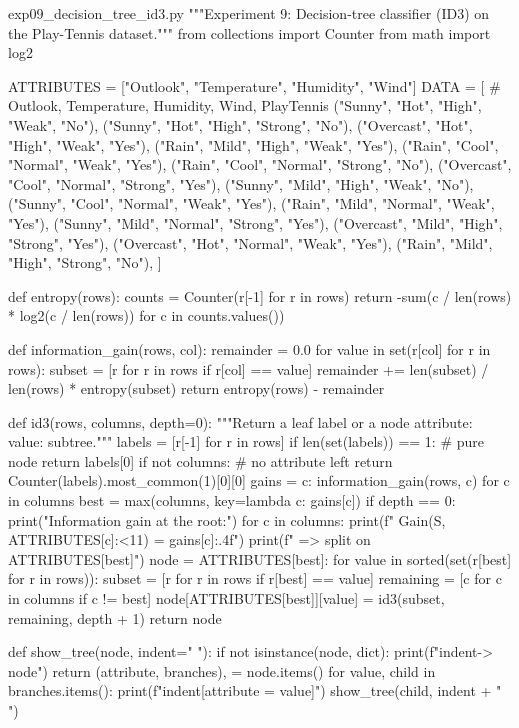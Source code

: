 \documentclass[11pt,a4paper]{article}
\begin{document}
\begin{pycode}{exp09\_decision\_tree\_id3.py}
"""Experiment 9: Decision-tree classifier (ID3) on the Play-Tennis dataset."""
from collections import Counter
from math import log2

ATTRIBUTES = ["Outlook", "Temperature", "Humidity", "Wind"]
DATA = [  # Outlook, Temperature, Humidity, Wind, PlayTennis
    ("Sunny", "Hot", "High", "Weak", "No"),
    ("Sunny", "Hot", "High", "Strong", "No"),
    ("Overcast", "Hot", "High", "Weak", "Yes"),
    ("Rain", "Mild", "High", "Weak", "Yes"),
    ("Rain", "Cool", "Normal", "Weak", "Yes"),
    ("Rain", "Cool", "Normal", "Strong", "No"),
    ("Overcast", "Cool", "Normal", "Strong", "Yes"),
    ("Sunny", "Mild", "High", "Weak", "No"),
    ("Sunny", "Cool", "Normal", "Weak", "Yes"),
    ("Rain", "Mild", "Normal", "Weak", "Yes"),
    ("Sunny", "Mild", "Normal", "Strong", "Yes"),
    ("Overcast", "Mild", "High", "Strong", "Yes"),
    ("Overcast", "Hot", "Normal", "Weak", "Yes"),
    ("Rain", "Mild", "High", "Strong", "No"),
]


def entropy(rows):
    counts = Counter(r[-1] for r in rows)
    return -sum(c / len(rows) * log2(c / len(rows)) for c in counts.values())


def information_gain(rows, col):
    remainder = 0.0
    for value in set(r[col] for r in rows):
        subset = [r for r in rows if r[col] == value]
        remainder += len(subset) / len(rows) * entropy(subset)
    return entropy(rows) - remainder


def id3(rows, columns, depth=0):
    """Return a leaf label or a node {attribute: {value: subtree}}."""
    labels = [r[-1] for r in rows]
    if len(set(labels)) == 1:                  # pure node
        return labels[0]
    if not columns:                            # no attribute left
        return Counter(labels).most_common(1)[0][0]
    gains = {c: information_gain(rows, c) for c in columns}
    best = max(columns, key=lambda c: gains[c])
    if depth == 0:
        print("Information gain at the root:")
        for c in columns:
            print(f"   Gain(S, {ATTRIBUTES[c]:<11}) = {gains[c]:.4f}")
        print(f"   => split on {ATTRIBUTES[best]}\n")
    node = {ATTRIBUTES[best]: {}}
    for value in sorted(set(r[best] for r in rows)):
        subset = [r for r in rows if r[best] == value]
        remaining = [c for c in columns if c != best]
        node[ATTRIBUTES[best]][value] = id3(subset, remaining, depth + 1)
    return node


def show_tree(node, indent="   "):
    if not isinstance(node, dict):
        print(f"{indent}-> {node}")
        return
    (attribute, branches), = node.items()
    for value, child in branches.items():
        print(f"{indent}[{attribute} = {value}]")
        show_tree(child, indent + "    ")



\end{pycode}
\end{document}
